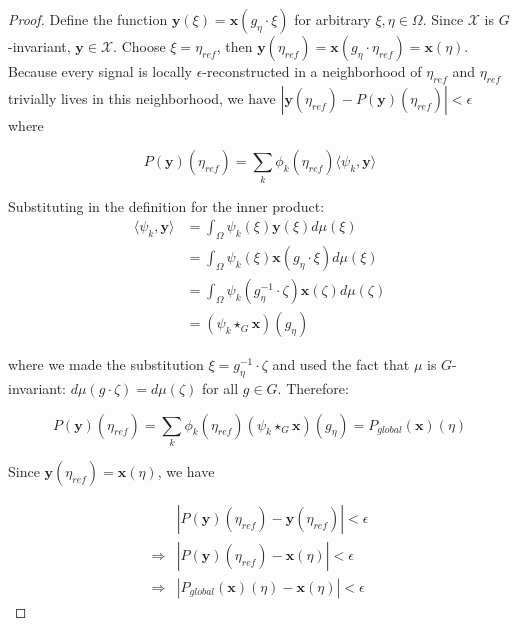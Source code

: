 \documentclass[10pt,a4paper]{amsart}
\begin{document}
\begin{proof}
Define the function $\mathbf y(\xi) = \mathbf x(g_\eta\cdot  \xi)$ for arbitrary $\xi, \eta \in \Omega$. Since $\mathcal{X}$ is $G$-invariant, $\mathbf y \in \mathcal X$. Choose $\xi = \eta_{\textit{ref}}$, then  $\mathbf y(\eta_{\textit{ref}}) = \mathbf x(g_\eta\cdot  \eta_{\textit{ref}}) = \mathbf x(\eta)$. 
%
Because every signal is locally $\epsilon$-reconstructed in a neighborhood of $\eta_{\textit{ref}}$ and $\eta_{\textit{ref}}$ trivially lives in this neighborhood, we have $|\mathbf y(\eta_{\textit{ref}})  -  P (\mathbf{y})(\eta_{\textit{ref}})| < \epsilon$ where 

$$
 P (\mathbf{y})(\eta_{\textit{ref}})   
    = \sum_k \phi_k(\eta_{\textit{ref}}) \langle \psi_k, \mathbf y\rangle
$$

\noindent Substituting in the definition for the inner product: 
\begin{align*}
    \langle \psi_k, \mathbf y \rangle 
    &= \int_\Omega \psi_k(\xi) \mathbf y(\xi) d\mu(\xi)
    \\
    &= \int_\Omega \psi_k(\xi) \mathbf x(g_\eta \cdot \xi) d\mu(\xi) \\
    &= \int_\Omega \psi_k(g_\eta^{-1} \cdot \zeta) \mathbf x(\zeta) d\mu(\zeta) \\
    &= (\psi_k \star_G \mathbf x)(g_\eta)
\end{align*}

\noindent where we made the substitution $\xi = g_\eta^{-1} \cdot \zeta$ and used the fact that $\mu$ is $G$-invariant: $d\mu(g\cdot \zeta) = d\mu(\zeta)$ for all $g\in G$. Therefore:


$$
P(\mathbf y)(\eta_{\textit{ref}})= \sum_k \phi_k(\eta_{\textit{ref}}) (\psi_k \star_G \mathbf x)(g_\eta) = P_{\textit{global}}(\mathbf{x})(\eta)
$$

Since $\mathbf y(\eta_{\textit{ref}}) = \mathbf{x}(\eta)$, we have 

\begin{align*}
    &|P(\mathbf{y})(\eta_{\textit{ref}}) - \mathbf{y}(\eta_{\textit{ref}})| < \epsilon \\
    \Rightarrow 
    &|P(\mathbf{y})(\eta_{\textit{ref}}) - \mathbf{x}(\eta)| < \epsilon \\
    \Rightarrow
    &|P_{\textit{global}}(\mathbf{x})(\eta) - \mathbf{x}(\eta)| < \epsilon 
\end{align*}

\end{proof}
\end{document}
